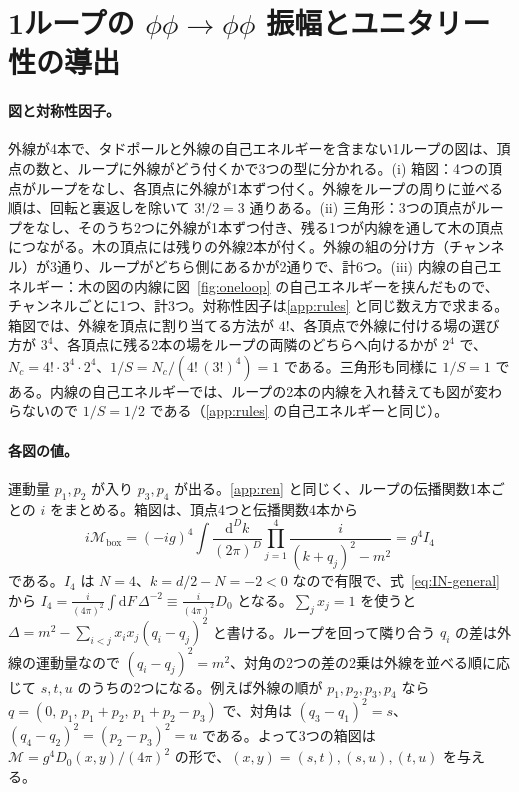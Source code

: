 \documentclass[a4paper,10pt]{ltjsarticle}
\newcommand{\dd}{\mathrm{d}}
\begin{document}
\section{1ループの $\phi\phi\to\phi\phi$ 振幅とユニタリー性の導出}\label{app:scat}

\paragraph{図と対称性因子。}外線が4本で、タドポールと外線の自己エネルギーを含まない1ループの図は、頂点の数と、ループに外線がどう付くかで3つの型に分かれる。(i) 箱図：4つの頂点がループをなし、各頂点に外線が1本ずつ付く。外線をループの周りに並べる順は、回転と裏返しを除いて $3!/2=3$ 通りある。(ii) 三角形：3つの頂点がループをなし、そのうち2つに外線が1本ずつ付き、残る1つが内線を通して木の頂点につながる。木の頂点には残りの外線2本が付く。外線の組の分け方（チャンネル）が3通り、ループがどちら側にあるかが2通りで、計6つ。(iii) 内線の自己エネルギー：木の図の内線に図~\ref{fig:oneloop} の自己エネルギーを挟んだもので、チャンネルごとに1つ、計3つ。対称性因子は\ref{app:rules} と同じ数え方で求まる。箱図では、外線を頂点に割り当てる方法が $4!$、各頂点で外線に付ける場の選び方が $3^4$、各頂点に残る2本の場をループの両隣のどちらへ向けるかが $2^4$ で、$N_c=4!\cdot3^4\cdot2^4$、$1/S=N_c/(4!\,(3!)^4)=1$ である。三角形も同様に $1/S=1$ である。内線の自己エネルギーでは、ループの2本の内線を入れ替えても図が変わらないので $1/S=1/2$ である（\ref{app:rules} の自己エネルギーと同じ）。

\paragraph{各図の値。}運動量 $p_1,p_2$ が入り $p_3,p_4$ が出る。\ref{app:ren} と同じく、ループの伝播関数1本ごとの $i$ をまとめる。箱図は、頂点4つと伝播関数4本から
\begin{equation*}
i\mathcal{M}_{\text{box}}=(-ig)^4\int\frac{\dd^Dk}{(2\pi)^D}\prod_{j=1}^{4}\frac{i}{(k+q_j)^2-m^2}=g^4I_4
\end{equation*}
である。$I_4$ は $N=4$、$k=d/2-N=-2<0$ なので有限で、式~\eqref{eq:IN-general} から $I_4=\frac{i}{(4\pi)^2}\int\dd F\,\Delta^{-2}\equiv\frac{i}{(4\pi)^2}D_0$ となる。$\sum_jx_j=1$ を使うと $\Delta=m^2-\sum_{i<j}x_ix_j(q_i-q_j)^2$ と書ける。ループを回って隣り合う $q_i$ の差は外線の運動量なので $(q_i-q_j)^2=m^2$、対角の2つの差の2乗は外線を並べる順に応じて $s,t,u$ のうちの2つになる。例えば外線の順が $p_1,p_2,p_3,p_4$ なら $q=(0,\,p_1,\,p_1+p_2,\,p_1+p_2-p_3)$ で、対角は $(q_3-q_1)^2=s$、$(q_4-q_2)^2=(p_2-p_3)^2=u$ である。よって3つの箱図は $\mathcal{M}=g^4D_0(x,y)/(4\pi)^2$ の形で、$(x,y)=(s,t),(s,u),(t,u)$ を与える。
\end{document}
